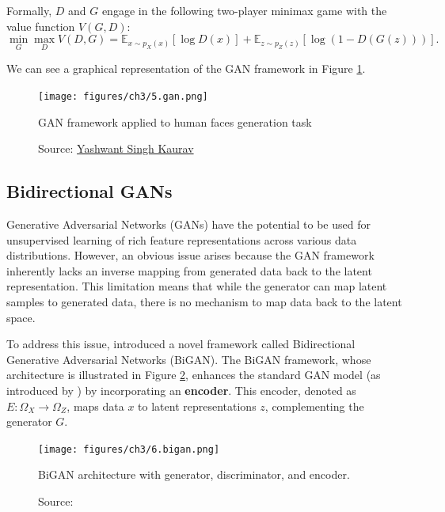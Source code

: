 Formally, \( D \) and \( G \) engage in the following
two-player minimax game with the value function \( V(G, D) \):
\begin{equation}
\min_G \max_D V(D, G) = \mathbb{E}_{x \sim p_X(x)}[\log D(x)] + \mathbb{E}_{z \sim p_Z(z)}[\log (1 - D(G(z)))].
\end{equation}

We can see a graphical representation of the GAN framework in Figure \ref{fig:gan}.
\begin{figure}[h]
    \centering
    \texttt{[image: figures/ch3/5.gan.png]}
    \caption{GAN framework applied to human faces generation task}
    \vspace{-10px}
    \caption*{\scriptsize{Source: \href{https://www.linkedin.com/pulse/exploring-fascinating-realm-generative-adversarial-networks-kaurav/}{Yashwant Singh Kaurav}}}
    \label{fig:gan}
\end{figure}

\subsection{Bidirectional GANs}
\label{sec:bigan}

Generative Adversarial Networks (GANs) have the potential to be used
for unsupervised learning of rich feature representations across various
data distributions. However, an obvious issue arises because
the GAN framework inherently lacks an inverse mapping from generated data
back to the latent representation.
This limitation means that while the generator can map latent samples
to generated data, there is no mechanism to map data back to the latent space.

To address this issue, \cite{donahue2017} introduced a novel framework
called Bidirectional Generative Adversarial Networks (BiGAN).
The BiGAN framework, whose architecture is illustrated
in Figure \ref{fig:bigan}, enhances the standard GAN model
(as introduced by \cite{goodfellow2014}) by incorporating an \textbf{encoder}.
This encoder, denoted as \( E: \Omega_X \rightarrow \Omega_Z \),
maps data \( x \) to latent representations
\( z \), complementing the generator \( G \).

\begin{figure}[h]
    \centering
    \texttt{[image: figures/ch3/6.bigan.png]}
    \caption{BiGAN architecture with generator, discriminator, and encoder.}
    \vspace{-10px}
    \caption*{\scriptsize{Source: \cite{donahue2017}}}
    \label{fig:bigan}
\end{figure}

